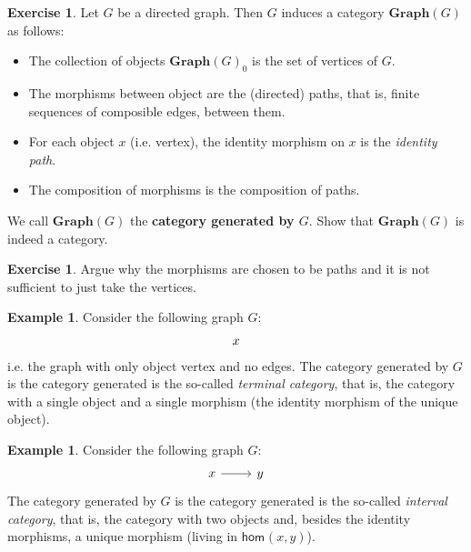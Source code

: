 \documentclass[a4paper,10pt]{scrartcl}
\theoremstyle{plain}
\theoremstyle{definition}
\newtheorem{exa}[thm]{Example}
\newtheorem{exer}[thm]{Exercise}
\newcommand{\cfont}[1]{\ensuremath{\mathsf{#1}}}
\newcommand{\Ob}[1]{{#1}_0}
\newcommand{\Hom}[3][]{\cfont{hom}_{#1}(#2,#3)}
\begin{document}
\begin{exer} Let $G$ be a directed graph. Then $G$ induces a category $\mathbf{Graph}(G)$ as follows:
\begin{itemize}
\item The collection of objects $\Ob{\mathbf{Graph}(G)}$ is the set of vertices of $G$. 
\item The morphisms between object are the (directed) paths, that is, finite sequences of composible edges, between them.
\item For each object $x$ (i.e. vertex), the identity morphism on $x$ is the \textit{identity path}.
\item The composition of morphisms is the composition of paths.
\end{itemize}
We call $\mathbf{Graph}(G)$ the \textbf{category generated by $G$}. Show that $\mathbf{Graph}(G)$ is indeed a category.
\end{exer}

\begin{exer} Argue why the morphisms are chosen to be paths and it is not sufficient to just take the vertices. 
\end{exer}

\begin{exa}\label{exa:graph_terminalcat} Consider the following graph $G$:
\[
\begin{tikzcd}
x
\end{tikzcd}
\]
i.e. the graph with only object vertex and no edges. The category generated by $G$ is the category generated is the so-called \textit{terminal category}, that is, the category with a single object and a single morphism (the identity morphism of the unique object). 
\end{exa}

\begin{exa}\label{exa:graph_intervalcat} Consider the following graph $G$:
\[
\begin{tikzcd}
x \arrow[r] & y
\end{tikzcd}
\]
The category generated by $G$ is the category generated is the so-called \textit{interval category}, that is, the category with two objects and, besides the identity morphisms, a unique morphism (living in $\Hom{x}{y}$).
\end{exa}
\end{document}

